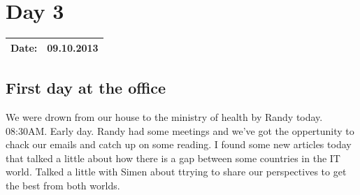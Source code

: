 \section{Day 3}
\begin{tabular}{|c|c|}
\hline
Date: & 09.10.2013 \\
\hline
\end{tabular}
\subsection{First day at the office}
We were drown from our house to the ministry of health by Randy today. 08:30AM. Early day. Randy had some meetings and we've got the oppertunity to chack our emails and catch up on some reading. I found some new articles today that talked a little about how there is a gap between some countries in the IT world. Talked a little with Simen about ttrying to share our perspectives to get the best from both worlds.
